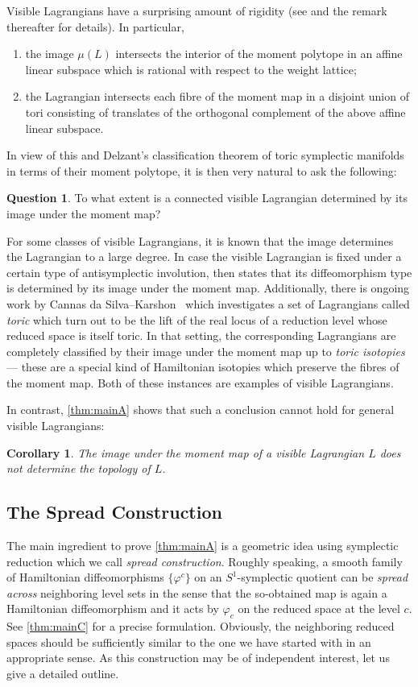 \documentclass[10pt,oneside,reqno]{amsart}
\newtheorem{corollary}[theorem]{Corollary}
\theoremstyle{definition}
\newtheorem*{question}{Question}
\begin{document}
Visible Lagrangians have a surprising amount of rigidity (see \cite[Theorem 5.1]{evans2023lectures} and the remark thereafter for details). In particular,  
\begin{enumerate}
    \item the image $\mu(L)$ intersects the interior of the moment polytope in an affine linear subspace which is rational with respect to the weight lattice;
    \item the Lagrangian intersects each fibre of the moment map in a disjoint union of tori consisting of translates of the orthogonal complement of the above affine linear subspace.
\end{enumerate}
In view of this and Delzant's classification theorem of toric symplectic manifolds in terms of their moment polytope, it is then very natural to ask the following:
\begin{question} \label{qu:determinedbyimage}
    To what extent is a connected visible Lagrangian determined by its image under the moment map?
\end{question}
For some classes of visible Lagrangians, it is known that the image determines the Lagrangian to a large degree. In case the visible Lagrangian is fixed under a certain type of antisymplectic involution, then \cite[Theorem B]{brendel2023topology} states that its diffeomorphism type is determined by its image under the moment map. Additionally, there is ongoing work by Cannas da Silva--Karshon~\cite{cannas2025toric} which investigates a set of Lagrangians called \emph{toric} which turn out to be the lift of the real locus of a reduction level whose reduced space is itself toric. In that setting, the corresponding Lagrangians are completely classified by their image under the moment map up to \emph{toric isotopies} --- these are a special kind of Hamiltonian isotopies which preserve the fibres of the moment map. Both of these instances are examples of visible Lagrangians. 

In contrast, \cref{thm:mainA} shows that such a conclusion cannot hold for general visible Lagrangians:
\begin{corollary}
    The image under the moment map of a visible Lagrangian $L$ does not determine the topology of $L$.
\end{corollary}


\subsection{The Spread Construction}
The main ingredient to prove \cref{thm:mainA} is a geometric idea using symplectic reduction which we call \emph{spread construction}. Roughly speaking, a smooth family of Hamiltonian diffeomorphisms $\{\varphi^c\}$ on an $S^1$-symplectic quotient can be \emph{spread across} neighboring level sets in the sense that the so-obtained map is again a Hamiltonian diffeomorphism and it acts by $\varphi_c$ on the reduced space at the level $c$. See \cref{thm:mainC} for a precise formulation. Obviously, the neighboring reduced spaces should be sufficiently similar to the one we have started with in an appropriate sense. As this construction may be of independent interest, let us give a detailed outline. 
\end{document}
